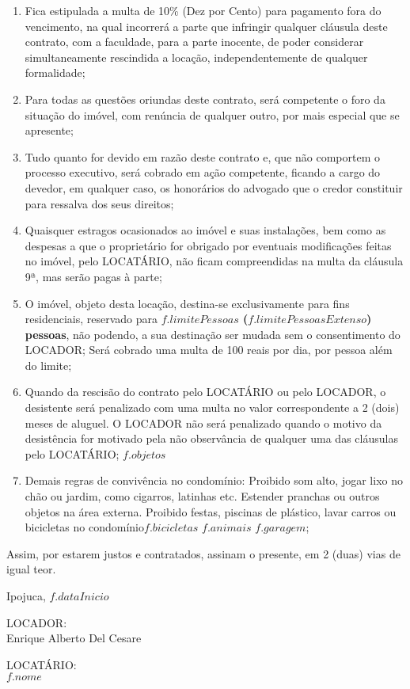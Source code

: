 \documentclass[a4paper,12pt]{article}
\begin{document}
\begin{enumerate}
\item Fica estipulada a multa de 10\% (Dez por Cento) para pagamento fora do vencimento, na qual incorrerá a parte que infringir qualquer cláusula deste contrato, com a faculdade, para a parte inocente, de poder considerar simultaneamente rescindida a locação, independentemente de qualquer formalidade;
\item Para todas as questões oriundas deste contrato, será competente o foro da situação do imóvel, com renúncia de qualquer outro, por mais especial que se apresente;
\item Tudo quanto for devido em razão deste contrato e, que não comportem o processo executivo, será cobrado em ação competente, ficando a cargo do devedor, em qualquer caso, os honorários do advogado que o credor constituir para ressalva dos seus direitos;
\item Quaisquer estragos ocasionados ao imóvel e suas instalações, bem como as despesas a que o proprietário for obrigado por eventuais modificações feitas no imóvel, pelo LOCATÁRIO, não ficam compreendidas na multa da cláusula 9ª, mas serão pagas à parte;
\item O imóvel, objeto desta locação, destina-se exclusivamente para fins residenciais,
reservado para \textbf{${f.limitePessoas}$  (${f.limitePessoasExtenso}$)  pessoas},  não podendo, a sua destinação ser mudada sem o consentimento do LOCADOR;
Será cobrado uma multa de 100 reais por dia, por pessoa além do limite;
\item Quando da rescisão do contrato pelo LOCATÁRIO  ou pelo LOCADOR, o desistente será penalizado com uma multa no valor correspondente a 2 (dois) meses de aluguel. O LOCADOR não será penalizado quando o motivo da desistência for motivado pela não observância de qualquer uma das cláusulas pelo LOCATÁRIO;
${f.objetos}$
\item Demais regras de convivência no condomínio: Proibido som alto, jogar lixo no chão ou jardim, como cigarros, latinhas etc.
Estender pranchas ou outros objetos na área externa.
Proibido festas, piscinas de plástico, lavar carros ou bicicletas no condomínio${f.bicicletas}$ ${f.animais}$ ${f.garagem}$;

\end{enumerate}
Assim, por estarem justos e contratados, assinam o presente, em 2 (duas) vias de igual teor.

\begin{flushright}
Ipojuca, ${f.dataInicio}$

\end{flushright}

\begin{center}

\vspace{2cm}

LOCADOR: \hrulefill
\\Enrique Alberto Del Cesare

\vspace{2.5cm}

LOCATÁRIO: \hrulefill
\\${f.nome}$
 \end{center}
\end{document}
